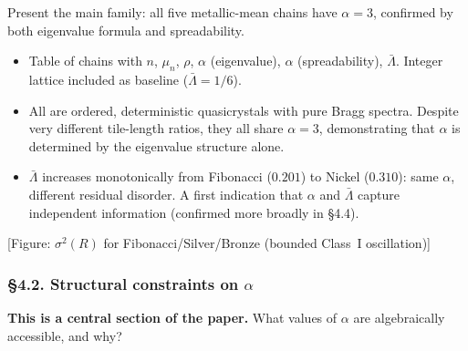 \documentclass[11pt]{article}
\newcommand{\fig}[1]{{\color{figcolor}\textsf{[Figure: #1]}}}
\newcommand{\Lb}{\bar\Lambda}
\begin{document}
Present the main family: all five metallic-mean chains have $\alpha = 3$,
confirmed by both eigenvalue formula and spreadability.

\begin{itemize}[leftmargin=1.5em]
  \item Table of chains with $n$, $\mu_n$, $\rho$, $\alpha$ (eigenvalue),
        $\alpha$ (spreadability), $\Lb$.
        Integer lattice included as baseline ($\Lb = 1/6$).
  \item All are ordered, deterministic quasicrystals with pure
        Bragg spectra. Despite very different tile-length ratios,
        they all share $\alpha = 3$, demonstrating that $\alpha$ is
        determined by the eigenvalue structure alone.
  \item $\Lb$ increases monotonically from Fibonacci ($0.201$) to
        Nickel ($0.310$): same $\alpha$, different residual disorder.
        A first indication that $\alpha$ and $\Lb$ capture
        independent information (confirmed more broadly in \S4.4).
\end{itemize}

\fig{$\sigma^2(R)$ for Fibonacci/Silver/Bronze (bounded Class~I oscillation)}

\subsubsection{\S4.2. Structural constraints on $\alpha$}

\textbf{This is a central section of the paper.} What values of $\alpha$
are algebraically accessible, and why?
\end{document}
